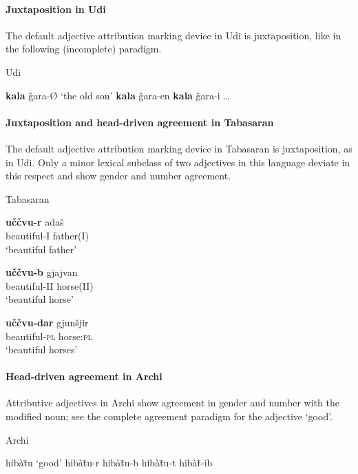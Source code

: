 \paragraph*{Juxtaposition in Udi}
The default adjective attribution marking device in Udi is juxtaposition, like in the following (incomplete) paradigm.
\begin{exe}
\settowidth{}
\ex 
\rm{Udi \citep[465]{schulze-furhoff1994}}
\begin{xlist}
\ex \textbf{kala} ĝara-Ø	\rm{‘the old son’}	
\ex \textbf{kala} ĝara-en					
\ex \textbf{kala} ĝara-i					
\ex \dots
\end{xlist}
\end{exe}

\paragraph*{Juxtaposition and head\hyp{}driven agreement in Tabasaran}
The default adjective attribution marking device in Tabasaran is juxtaposition, as in Udi. Only a minor lexical subclass of two adjectives in this language deviate in this respect and show gender and number agreement.
\begin{exe}
\ex 
\rm{Tabasaran \citep[50–51]{kurbanov1986}}
\begin{xlist}
\ex 
\gll 	\textbf{uččvu-r} adaš\\
	beautiful-\textsc{I} father\textsc{(I)}\\
\glt	‘beautiful father’

\ex 
\gll	\textbf{uččvu-b} gjajvan\\
	beautiful-\textsc{II} horse\textsc{(II)}\\
\glt	‘beautiful horse’

\ex
\gll	\textbf{uččvu-dar} gjunšjir\\
	beautiful-\textsc{pl} horse:\textsc{pl}\\
\glt	‘beautiful horses’
\end{xlist}
\end{exe}

\paragraph*{Head\hyp{}driven agreement in Archi}
Attributive adjectives in Archi show agreement in gender and number with the modified noun; see the complete agreement paradigm for the adjective ‘good’.
\begin{exe}
\settowidth\jamwidth{[\textsc{IV sg}]}
\ex 
\rm{Archi \citep{kibrik1994a}}
\begin{xlist}
\ex	hibàt̄u	\rm{‘good’}	\jambox{\rm{[\textsc{I sg}]}}
\ex	hibàt̄u-r				\jambox{\rm{[\textsc{II sg}]}}
\ex	hibàt̄u-b				
\ex	hibàt̄u-t				\jambox{\rm{[\textsc{IV sg}]}}
\ex	hibàt̄-ib				\jambox{\rm{[\textsc{pl}]}}
\end{xlist}
\end{exe}

